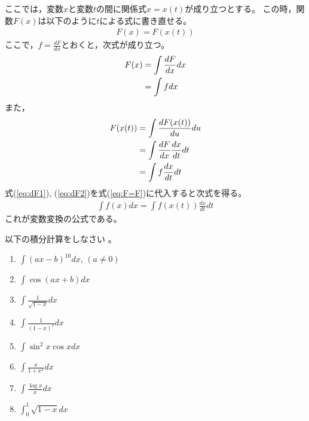 \documentclass[twocolumn,11pt]{jarticle}
\begin{document}
ここでは，変数$x$と変数$t$の間に関係式$x=x(t)$が成り立つとする。
この時，関数$F(x)$は以下のように$t$による式に書き直せる。
\begin{align}
\label{eq:F=F}
F(x)=F(x(t))
\end{align}
ここで，$f=\frac{dF}{dx}$とおくと，次式が成り立つ。
\begin{align}
	F(x)&=\int\frac{dF}{dx}dx\notag\\
	&=\int fdx
\label{eq:dF1}
\end{align}
また，
\begin{align}
F(x(t))&=\int\frac{dF(x(t))}{du}du\notag\\
	&=\int\frac{dF}{dx}\frac{dx}{dt}dt\notag\\
	&=\int f\frac{dx}{dt}dt
\label{eq:dF2}	
\end{align}
式(\ref{eq:dF1}), (\ref{eq:dF2})を式(\ref{eq:F=F})に代入すると次式を得る。
\begin{align*}
  \int f(x)dx=\int f(x(t))\frac{dx}{dt}dt
\end{align*}
これが変数変換の公式である。

\exercise
以下の積分計算をしなさい
。
\begin{enumerate}
\item \label{item:ax-b}$\displaystyle\int (a x-b)^{10}dx$, $(a\ne 0)$
\item \label{item:cos(ax+b)}$\displaystyle\int \cos(ax+b) dx$
\item \label{item:1/sqrt(1-x)}$\displaystyle\int \frac{1}{\sqrt{1-x}}dx$
\item \label{item:1/(1-x)2}$\displaystyle\int \frac{1}{(1-x)^2}dx$
\item \label{item:sin2xcosx-2}$\displaystyle\int\sin^2x\cos xdx$
\item \label{item:x/(1+x2)-2}$\displaystyle\int \frac{x}{1+x^2}dx$
\item \label{item:logx/x:2}$\displaystyle\int \frac{\log x}{x}dx$
\item \label{item:sqrt(1-x)}$\displaystyle\int_0^1 \sqrt{1-x} dx$
\end{enumerate}
\end{document}
